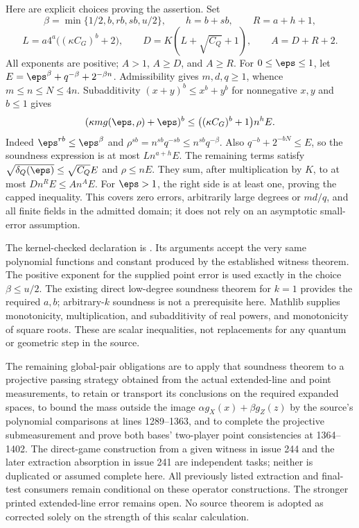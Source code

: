 \documentclass[11pt]{article}
\begin{document}
Here are explicit choices proving the assertion. Set
\[
 \beta=\min\{1/2,b,rb,sb,u/2\},\qquad
 h=b+sb,\qquad R=a+h+1,
\]
\[
 L=a4^a\bigl((\kappa C_G)^b+2\bigr),\qquad
 D=K(L+\sqrt{C_Q}+1),\qquad A=D+R+2.
\]
All exponents are positive; $A>1$, $A\geq D$, and $A\geq R$.
For $0\leq\eps\leq1$, let
$E=\eps^\beta+q^{-\beta}+2^{-\beta n}$. Admissibility gives
$m,d,q\geq1$, whence $m\leq n\leq N\leq4n$.
Subadditivity $(x+y)^b\leq x^b+y^b$ for nonnegative $x,y$ and
$b\leq1$ gives
\[
 (\kappa m g(\eps,\rho)+\eps)^b
 \leq\bigl((\kappa C_G)^b+1\bigr)n^hE.
\]
Indeed $\eps^{rb}\leq\eps^\beta$ and
$\rho^{sb}=n^{sb}q^{-sb}\leq n^{sb}q^{-\beta}$.
Also $q^{-b}+2^{-bN}\leq E$, so the soundness expression is at most
$Ln^{a+h}E$. The remaining terms satisfy
$\sqrt{\delta_Q(\eps)}\leq\sqrt{C_Q}E$ and $\rho\leq nE$.
They sum, after multiplication by $K$, to at most $Dn^RE\leq An^AE$.
For $\eps>1$, the right side is at least one, proving the capped
inequality. This covers zero errors, arbitrarily large degrees or $md/q$,
and all finite fields in the admitted domain; it does not rely on an
asymptotic small-error assumption.

The kernel-checked declaration is
.
Its arguments accept the very same polynomial functions and constant
produced by the established witness theorem. The positive exponent for
the supplied point error is used exactly in the choice $\beta\leq u/2$.
The existing direct low-degree soundness theorem for $k=1$ provides the
required $a,b$; arbitrary-$k$ soundness is not a prerequisite here.
Mathlib supplies monotonicity, multiplication, and subadditivity of real
powers, and monotonicity of square roots. These are scalar inequalities,
not replacements for any quantum or geometric step in the source.

The remaining global-pair obligations are to apply that soundness theorem
to a projective passing strategy obtained from the actual extended-line
and point measurements, to retain or transport its conclusions on the
required expanded spaces, to bound the mass outside the image
$\alpha g_X(x)+\beta g_Z(z)$ by the source's polynomial comparisons at
lines 1289--1363, and to complete the projective submeasurement and prove
both bases' two-player point consistencies at 1364--1402. The direct-game
construction from a given witness in issue 244 and the later extraction
absorption in issue 241 are independent tasks; neither is duplicated or
assumed complete here. All previously listed extraction and final-test
consumers remain conditional on these operator constructions. The stronger
printed extended-line error remains open. No source theorem is adopted as
corrected solely on the strength of this scalar calculation.
\end{document}
